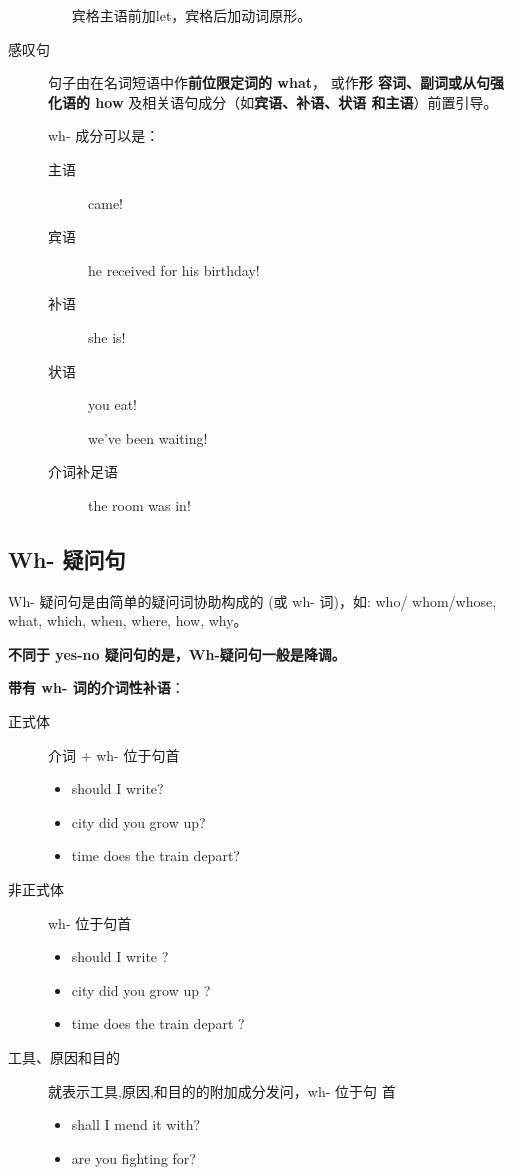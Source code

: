 \begin{description}
\begin{itemize}
    宾格主语前加let，宾格后加动词原形。
  \end{itemize}


\item[感叹句] 句子由在名词短语中作\textbf{前位限定词的 what}， 或作\textbf{形
    容词、副词或从句强化语的 how} 及相关语句成分（如\textbf{宾语、补语、状语
    和主语}）前置引导。

  wh- 成分可以是：
  \begin{description}

  \item[主语]  came!
  \item[宾语]  he received for his birthday!

  \item[补语]  she is!

  \item[状语]  you eat!

     we've been waiting!

  \item[介词补足语]  the room was in!
  \end{description}
\end{description}

\subsection{Wh- 疑问句}

Wh- 疑问句是由简单的疑问词协助构成的 (或 wh- 词)，如: who/ whom/whose,
what, which, when, where, how, why。

\textbf{不同于 yes-no 疑问句的是，Wh-疑问句一般是降调。}

\textbf{带有 wh- 词的介词性补语}：
\begin{description}
\item[正式体]介词 + wh- 位于句首
  \begin{itemize}
  \item {} should I write?
  \item {} city did you grow up?
  \item {} time does the train depart?
  \end{itemize}
\item[非正式体] wh- 位于句首
  \begin{itemize}
  \item {} should I write ?
  \item {} city did you grow up ?
  \item {} time does the train depart ?
  \end{itemize}

\item[工具、原因和目的] 就表示工具,原因,和目的的附加成分发问，wh- 位于句
  首
  \begin{itemize}
  \item {} shall I mend it with?
  \item {} are you fighting for?
  \end{itemize}
\end{description}

